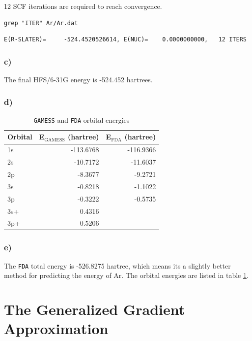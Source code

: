 \documentclass[11pt]{article}
\begin{document}
12 SCF iterations are required to reach convergence.

\begin{verbatim}
grep "ITER" Ar/Ar.dat
\end{verbatim}

\begin{verbatim}
E(R-SLATER)=     -524.4520526614, E(NUC)=    0.0000000000,   12 ITERS
\end{verbatim}


\subsubsection{c)}
\label{sec-1-1-3}

The final HFS/6-31G energy is -524.452  hartrees.

\subsubsection{d)}
\label{sec-1-1-4}

\begin{table}[htb]
\caption{\texttt{GAMESS} and \texttt{FDA} orbital energies \label{orbital-energies}}
\centering
\begin{tabular}{lrr}
Orbital & E$_{\text{GAMESS}}$ (hartree) & E$_{\text{FDA}}$ (hartree)\\
\hline
1s & -113.6768 & -116.9366\\
2s & -10.7172 & -11.6037\\
2p & -8.3677 & -9.2721\\
3s & -0.8218 & -1.1022\\
3p & -0.3222 & -0.5735\\
3s+ & 0.4316 & \\
3p+ & 0.5206 & \\
\end{tabular}
\end{table}


\subsubsection{e)}
\label{sec-1-1-5}

The \texttt{FDA} total energy is -526.8275 hartree, which means its a slightly better method for predicting the energy of Ar. The orbital energies are listed in table \ref{orbital-energies}. 

\section{The Generalized Gradient Approximation}
\label{sec-2}
\end{document}
